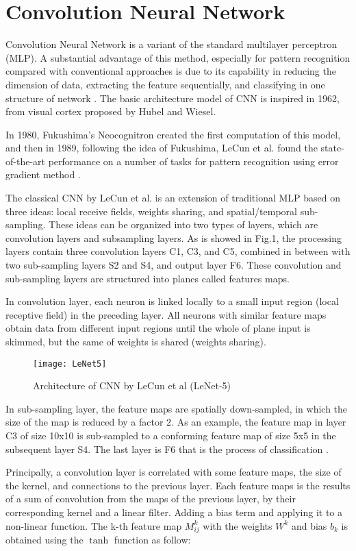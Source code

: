 \documentclass[10pt,letterpaper]{article}
\begin{document}
\section{Convolution Neural Network}
Convolution Neural Network is a variant of the standard multilayer perceptron (MLP). A substantial advantage of this method, especially for pattern recognition compared with conventional approaches is due to its capability in reducing the dimension of data, extracting the feature sequentially, and classifying in one structure of network \cite{Bengio}. The basic architecture model of CNN is inspired in 1962, from visual cortex proposed by Hubel and Wiesel. 

In 1980, Fukushima’s Neocognitron created the first computation of this model, and then in 1989, following the idea of Fukushima, LeCun et al. found the state-of-the-art performance on a number of tasks for pattern recognition using error gradient method \cite{LeCun}. 

The classical CNN by LeCun et al. is an extension of traditional MLP based on three ideas: local receive fields, weights sharing, and spatial/temporal sub-sampling. These ideas can be organized into two types of layers, which are convolution layers and subsampling layers. As is showed in Fig.1, the processing layers contain three convolution layers C1, C3, and C5, combined in between with two sub-sampling layers S2 and S4, and output layer F6. These convolution and sub-sampling layers are structured into planes called features maps.

In convolution layer, each neuron is linked locally to a small input region (local receptive field) in the preceding layer. All neurons with similar feature maps obtain data from different input regions until the whole of plane input is skimmed, but the same of weights is shared (weights sharing).

\begin{figure}
\texttt{[image: LeNet5]}
\caption{Architecture of CNN by LeCun et al (LeNet-5)}
\label{fig:my_label}
\end{figure}

In sub-sampling layer, the feature maps are spatially down-sampled, in which the size of the map is reduced by a factor 2. As an example, the feature map in layer C3 of size 10x10 is sub-sampled to a conforming feature map of size 5x5 in the subsequent layer S4. The last layer is F6 that is the process of classification \cite{LeCun}.

Principally, a convolution layer is correlated with some feature maps, the size of the kernel, and connections to the previous layer. Each feature maps is the results of a sum of convolution from the maps of the previous layer, by their corresponding kernel and a linear filter. Adding a bias term and applying it to a non-linear function. The k-th feature map \(M_{ij}^k\) with the weights \(W^k\) and bias \(b_k\) is obtained using the $\tanh$ function as follow:
\end{document}
